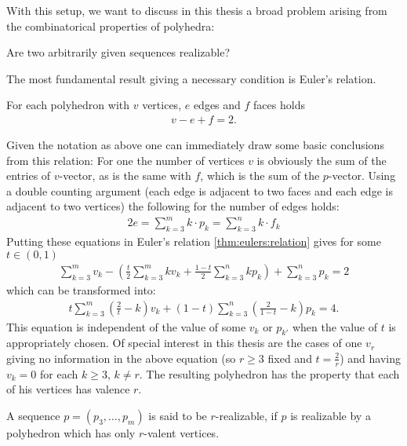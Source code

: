 With this setup, we want to discuss in this thesis a broad problem arising from the combinatorical properties of polyhedra:
\begin{problem} Are two arbitrarily given sequences realizable?
\end{problem}
The most fundamental result giving a necessary condition is Euler's relation.
\begin{theorem}\label{thm:eulers:relation}
  For each polyhedron with $v$ vertices, $e$ edges and $f$ faces holds
  \begin{align*}
    v - e + f = 2.
  \end{align*}
\end{theorem}
Given the notation as above one can immediately draw some basic conclusions from this relation: For one the number of vertices $v$ is obviously the sum of the entries of $v$-vector, as is the same with $f$, which is the sum of the $p$-vector. Using a double counting argument (each edge is adjacent to two faces and each edge is adjacent to two vertices) the following for the number of edges holds:
\begin{align*}
  2e = \sum_{k=3}^{m} k \cdot p_k = \sum_{k=3}^{n} k \cdot f_k
\end{align*}
Putting these equations in Euler's relation \autoref{thm:eulers:relation} gives for some $t \in (0, 1)$
\begin{align*}
  \sum_{k=3}^m v_k - \left(\frac{t}{2} \sum_{k=3}^m k v_k + \frac{1-t}{2} \sum_{k=3}^n k p_k \right) + \sum_{k=3}^n p_k = 2
\end{align*}
which can be transformed into:
\begin{align}
  t \sum_{k=3}^m \left(\frac{2}{t} - k \right) v_k + (1-t) \sum_{k=3}^n \left( \frac{2}{1-t} - k \right) p_k = 4. \label{eq:general:vp:relation}
\end{align}
This equation is independent of the value of some $v_k$ or $p_{k'}$ when the value of $t$ is appropriately chosen. Of special interest in this thesis are the cases of one $v_r$ giving no information in the above equation (so $r \geq 3$ fixed and $t = \frac{2}{r}$) and having $v_{k} = 0$ for each $k \geq 3$, $k \neq r$. The resulting polyhedron has the property that each of his vertices has valence $r$.
\begin{definition}[$r$-realizable]\label{def:r:realizable}
  A sequence $p = (p_3, \dots, p_m)$ is said to be $r$-realizable, if $p$ is realizable by a polyhedron which has only $r$-valent vertices.
\end{definition}
